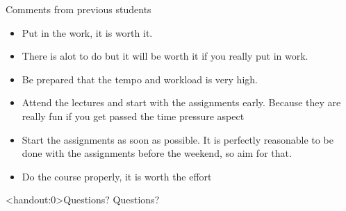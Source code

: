 \documentclass[10pt]{beamer}
\begin{document}
\begin{frame}{Comments from previous students}

\begin{itemize}
\item Put in the work, it is worth it. \pause
\item There is alot to do but it will be worth it if you really put in work. \pause
\item Be prepared that the tempo and workload is very high. \pause
\item Attend the lectures and start with the assignments early. Because they are really fun
if you get passed the time pressure aspect \pause
\item Start the assignments as soon as possible. It is perfectly reasonable to be done with
the assignments before the weekend, so aim for that. \pause
\item Do the course properly, it is worth the effort
\end{itemize}

\end{frame}


\begin{frame}<handout:0>{Questions?}
Questions?
\end{frame}

\end{document}
